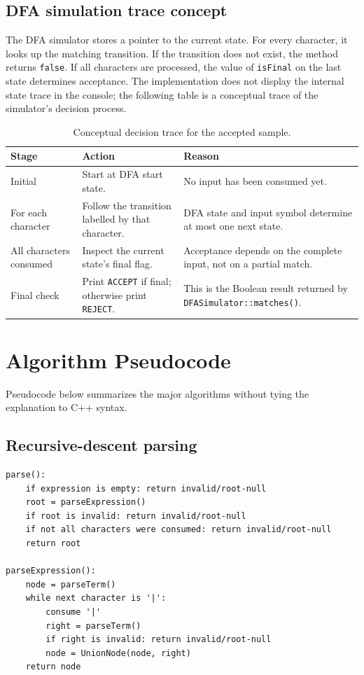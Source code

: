 \documentclass[12pt,a4paper]{report}
\begin{document}
\subsection{DFA simulation trace concept}
The DFA simulator stores a pointer to the current state. For every character, it looks up the matching transition. If the transition does not exist, the method returns \texttt{false}. If all characters are processed, the value of \texttt{isFinal} on the last state determines acceptance. The implementation does not display the internal state trace in the console; the following table is a conceptual trace of the simulator's decision process.
\begin{table}[htbp]
\centering
\caption{Conceptual decision trace for the accepted sample.}
\begin{tabular}{|p{2.1cm}|p{4.0cm}|p{5.2cm}|}
\hline
\textbf{Stage} & \textbf{Action} & \textbf{Reason} \\
\hline
Initial & Start at DFA start state. & No input has been consumed yet. \\
\hline
For each character & Follow the transition labelled by that character. & DFA state and input symbol determine at most one next state. \\
\hline
All characters consumed & Inspect the current state's final flag. & Acceptance depends on the complete input, not on a partial match. \\
\hline
Final check & Print \texttt{ACCEPT} if final; otherwise print \texttt{REJECT}. & This is the Boolean result returned by \texttt{DFASimulator::matches()}. \\
\hline
\end{tabular}
\end{table}

\section{Algorithm Pseudocode}
Pseudocode below summarizes the major algorithms without tying the explanation to C++ syntax.

\subsection{Recursive-descent parsing}
\begin{lstlisting}[language={},numbers=none]
parse():
    if expression is empty: return invalid/root-null
    root = parseExpression()
    if root is invalid: return invalid/root-null
    if not all characters were consumed: return invalid/root-null
    return root

parseExpression():
    node = parseTerm()
    while next character is '|':
        consume '|'
        right = parseTerm()
        if right is invalid: return invalid/root-null
        node = UnionNode(node, right)
    return node
\end{lstlisting}
\end{document}
